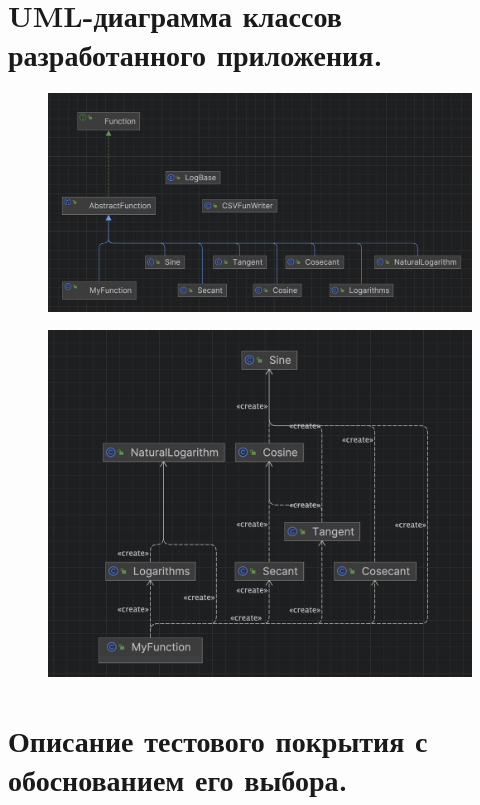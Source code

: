 \documentclass[12pt,onecolumn]{article}
\begin{document}
\section*{UML-диаграмма классов разработанного приложения.}
\begin{figure}[H]
    \centering
    \includegraphics[width=\textwidth]{image/UML1.png}
\end{figure}
\begin{figure}[H]
    \centering
    \includegraphics[width=\textwidth]{image/UML2.png}
\end{figure}
\section*{Описание тестового покрытия с обоснованием его выбора.}

\end{document}
